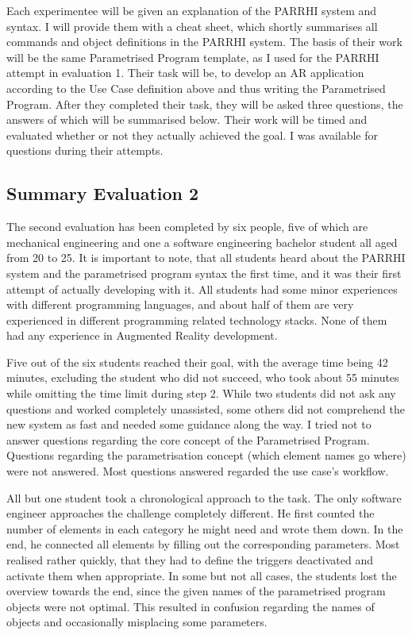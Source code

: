 \FloatBarrier

Each experimentee will be given an explanation of the PARRHI system and syntax. I will provide them with a cheat sheet, which shortly summarises all commands and object definitions in the PARRHI system. The basis of their work will be the same Parametrised Program template, as I used for the PARRHI attempt in evaluation 1. Their task will be, to develop an AR application according to the Use Case definition above and thus writing the Parametrised Program. After they completed their task, they will be asked three questions, the answers of which will be summarised below. Their work will be timed and evaluated whether or not they actually achieved the goal. I was available for questions during their attempts.

\subsection{Summary Evaluation 2}

The second evaluation has been completed by six people, five of which are mechanical engineering and one a software engineering bachelor student all aged from 20 to 25. It is important to note, that all students heard about the PARRHI system and the parametrised program syntax the first time, and it was their first attempt of actually developing with it. All students had some minor experiences with different programming languages, and about half of them are very experienced in different programming related technology stacks. None of them had any experience in Augmented Reality development.

Five out of the six students reached their goal, with the average time being 42 minutes, excluding the student who did not succeed, who took about 55 minutes while omitting the time limit during step 2. While two students did not ask any questions and worked completely unassisted, some others did not comprehend the new system as fast and needed some guidance along the way. I tried not to answer questions regarding the core concept of the Parametrised Program. Questions regarding the parametrisation concept (which element names go where) were not answered. Most questions answered regarded the use case's workflow.

All but one student took a chronological approach to the task. The only software engineer approaches the challenge completely different. He first counted the number of elements in each category he might need and wrote them down. In the end, he connected all elements by filling out the corresponding parameters. Most realised rather quickly, that they had to define the triggers deactivated and activate them when appropriate. In some but not all cases, the students lost the overview towards the end, since the given names of the parametrised program objects were not optimal. This resulted in confusion regarding the names of objects and occasionally misplacing some parameters.

